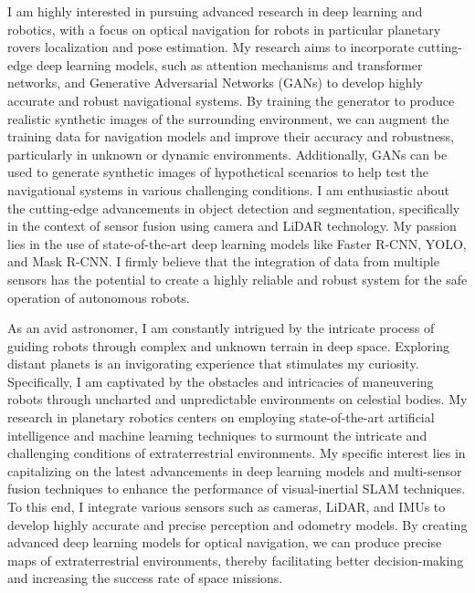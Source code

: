\documentclass[a4,20pt]{article}
\begin{document}
\begin{large}
\vspace{-0.25cm} \quad I am highly interested in pursuing advanced research in deep learning and robotics, with a focus on optical navigation for robots in particular planetary rovers localization and pose estimation. My research aims to incorporate cutting-edge deep learning models, such as attention mechanisms and transformer networks, and Generative Adversarial Networks (GANs) to develop highly accurate and robust navigational systems. By training the generator to produce realistic synthetic images of the surrounding environment, we can augment the training data for navigation models and improve their accuracy and robustness, particularly in unknown or dynamic environments. Additionally, GANs can be used to generate synthetic images of hypothetical scenarios to help test the navigational systems in various challenging conditions. I am enthusiastic about the cutting-edge advancements in object detection and segmentation, specifically in the context of sensor fusion using camera and LiDAR technology. My passion lies in the use of state-of-the-art deep learning models like Faster R-CNN, YOLO, and Mask R-CNN. I firmly believe that the integration of data from multiple sensors has the potential to create a highly reliable and robust system for the safe operation of autonomous robots.\par

\vspace{-0.25cm} \quad As an avid astronomer, I am constantly intrigued by the intricate process of guiding robots through complex and unknown terrain in deep space. Exploring distant planets is an invigorating experience that stimulates my curiosity. Specifically, I am captivated by the obstacles and intricacies of maneuvering robots through uncharted and unpredictable environments on celestial bodies. My research in planetary robotics centers on employing state-of-the-art artificial intelligence and machine learning techniques to surmount the intricate and challenging conditions of extraterrestrial environments. My specific interest lies in capitalizing on the latest advancements in deep learning models and multi-sensor fusion techniques to enhance the performance of visual-inertial SLAM techniques. To this end, I integrate various sensors such as cameras, LiDAR, and IMUs to develop highly accurate and precise perception and odometry models. By creating advanced deep learning models for optical navigation, we can produce precise maps of extraterrestrial environments, thereby facilitating better decision-making and increasing the success rate of space missions.\par


\end{large}
\end{document}
